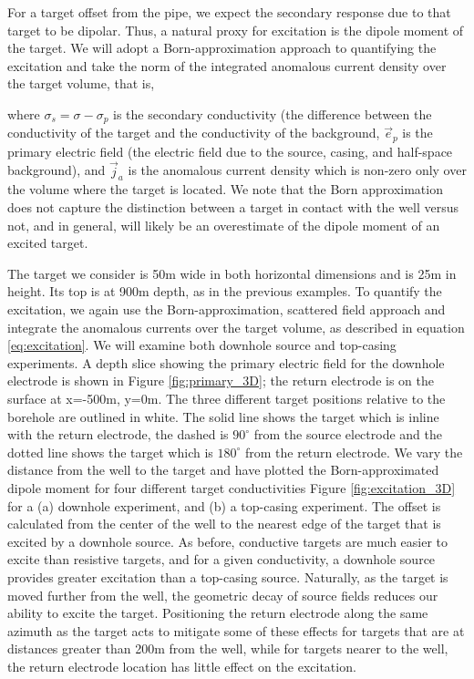 For a target offset from the pipe, we expect the secondary response due to that target to be dipolar. Thus, a natural proxy for excitation is the dipole moment of the target. We will adopt a Born-approximation approach to quantifying the excitation and take the norm of the integrated anomalous current density over the target volume, that is,


where $\sigma_s = \sigma - \sigma_p$ is the secondary conductivity (the difference between the conductivity of the target and the conductivity of the background, $\vec{e}_p$ is the primary electric field (the electric field due to the source, casing, and half-space background), and $\vec{j}_a$ is the anomalous current density which is non-zero only over the volume where the target is located. We note that the Born approximation does not capture the distinction between a target in contact with the well versus not, and in general, will likely be an overestimate of the dipole moment of an excited target.

The target we consider is 50m wide in both horizontal dimensions and is 25m in height. Its top is at 900m depth, as in the previous examples. To quantify the excitation, we again use the Born-approximation, scattered field approach and integrate the anomalous currents over the target volume, as described in equation \ref{eq:excitation}. We will examine both downhole source and top-casing experiments. A depth slice showing the primary electric field for the downhole electrode is shown in Figure \ref{fig:primary_3D}; the return electrode is on the surface at x=-500m, y=0m. The three different target positions relative to the borehole are outlined in white. The solid line shows the target which is inline with the return electrode, the dashed is $90^\circ$ from the source electrode and the dotted line shows the target which is $180^\circ$ from the return electrode. We vary the distance from the well to the target and have plotted the Born-approximated dipole moment for four different target conductivities Figure \ref{fig:excitation_3D} for a (a) downhole experiment, and (b) a top-casing experiment. The offset is calculated from the center of the well to the nearest edge of the target that is excited by a downhole source. As before, conductive targets are much easier to excite than resistive targets, and for a given conductivity, a downhole source provides greater excitation than a top-casing source. Naturally, as the target is moved further from the well, the geometric decay of source fields reduces our ability to excite the target. Positioning the return electrode along the same azimuth as the target acts to mitigate some of these effects for targets that are at distances greater than 200m from the well, while for targets nearer to the well, the return electrode location has little effect on the excitation.


